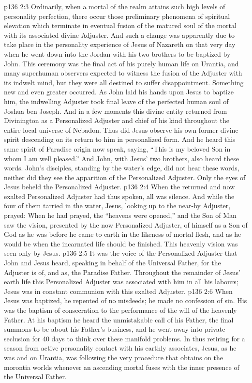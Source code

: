 \vs p136 2:3 Ordinarily, when a mortal of the realm attains such high levels of personality perfection, there occur those preliminary phenomena of spiritual elevation which terminate in eventual fusion of the matured soul of the mortal with its associated divine Adjuster. And such a change was apparently due to take place in the personality experience of Jesus of Nazareth on that very day when he went down into the Jordan with his two brothers to be baptized by John. This ceremony was the final act of his purely human life on Urantia, and many superhuman observers expected to witness the fusion of the Adjuster with its indwelt mind, but they were all destined to suffer disappointment. Something new and even greater occurred. As John laid his hands upon Jesus to baptize him, the indwelling Adjuster took final leave of the perfected human soul of Joshua ben Joseph. And in a few moments this divine entity returned from Divinington as a Personalized Adjuster and chief of his kind throughout the entire local universe of Nebadon. Thus did Jesus observe his own former divine spirit descending on its return to him in personalized form. And he heard this same spirit of Paradise origin now speak, saying, “This is my beloved Son in whom I am well pleased.” And John, with Jesus’ two brothers, also heard these words. John’s disciples, standing by the water’s edge, did not hear these words, neither did they see the apparition of the Personalized Adjuster. Only the eyes of Jesus beheld the Personalized Adjuster.
\vs p136 2:4 \pc When the returned and now exalted Personalized Adjuster had thus spoken, all was silence. And while the four of them tarried in the water, Jesus, looking up to the near\hyp{}by Adjuster, prayed:  When he had prayed, the “heavens were opened,” and the Son of Man saw the vision, presented by the now Personalized Adjuster, of himself as a Son of God as he was before he came to earth in the likeness of mortal flesh, and as he would be when the incarnated life should be finished. This heavenly vision was seen only by Jesus.
\vs p136 2:5 It was the voice of the Personalized Adjuster that John and Jesus heard, speaking in behalf of the Universal Father, for the Adjuster is of, and as, the Paradise Father. Throughout the remainder of Jesus’ earth life this Personalized Adjuster was associated with him in all his labours; Jesus was in constant communion with this exalted Adjuster.
\vs p136 2:6 \pc When Jesus was baptized, he repented of no misdeeds; he made no confession of sin. His was the baptism of consecration to the performance of the will of the heavenly Father. At his baptism he heard the unmistakable call of his Father, the final summons to be about his Father’s business, and he went away into private seclusion for 40 days to think over these manifold problems. In thus retiring for a season from active personality contact with his earthly associates, Jesus, as he was and on Urantia, was following the very procedure that obtains on the morontia worlds whenever an ascending mortal fuses with the inner presence of the Universal Father.
